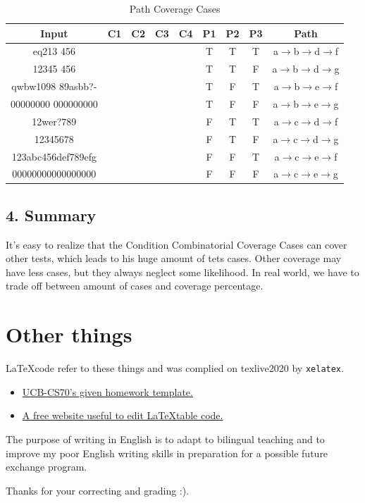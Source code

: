 \documentclass[11pt, oneside]{article}  %
\begin{document}
\begin{table}[H]
    \centering
    \begin{tabular}{|c|c|c|c|c|c|c|c|c|}
    \hline
    Input              & C1 & C2 & C3 & C4 & P1 & P2 & P3 & Path                                              \\ \hline
    eq213 456          &    &    &    &    & T  & T  & T  & a$\rightarrow$b$\rightarrow$d$\rightarrow$f \\ \hline
    12345 456          &    &    &    &    & T  & T  & F  & a$\rightarrow$b$\rightarrow$d$\rightarrow$g \\ \hline
    qwbw1098 89asbb?-  &    &    &    &    & T  & F  & T  & a$\rightarrow$b$\rightarrow$e$\rightarrow$f \\ \hline
    00000000 000000000 &    &    &    &    & T  & F  & F  & a$\rightarrow$b$\rightarrow$e$\rightarrow$g \\ \hline
    12wer?789          &    &    &    &    & F  & T  & T  & a$\rightarrow$c$\rightarrow$d$\rightarrow$f \\ \hline
    12345678           &    &    &    &    & F  & T  & F  & a$\rightarrow$c$\rightarrow$d$\rightarrow$g \\ \hline
    123abc456def789efg &    &    &    &    & F  & F  & T  & a$\rightarrow$c$\rightarrow$e$\rightarrow$f \\ \hline
    00000000000000000  &    &    &    &    & F  & F  & F  & a$\rightarrow$c$\rightarrow$e$\rightarrow$g \\ \hline
    \end{tabular}
    \caption{Path Coverage Cases}
\end{table}

\subsection*{4. Summary}

It's easy to realize that the Condition Combinatorial Coverage Cases can cover other tests, which leads to his huge amount of 
tets cases. Other coverage may have less cases, but they always neglect some likelihood. 
In real world, we have to trade off between amount of cases and coverage percentage.

\section*{Other things}

    \LaTeX \space code refer to these things and was complied on texlive2020 by \lstinline{xelatex}.
    \begin{itemize}
        \item  \href{https://www.eecs70.org/assets/misc/homework_template.tex}{UCB-CS70's given homework template.} 
        \item  \href{https://www.tablesgenerator.com/}{A free website useful to edit \LaTeX \space table code.}
    \end{itemize}

    The purpose of writing in English is to adapt to bilingual teaching and to improve my poor English 
    writing skills in preparation for a possible future exchange program. 

    Thanks for your correcting and grading :).
\end{document}
